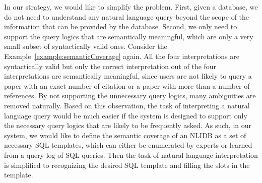 \documentclass{vldb}
\begin{document}
In our strategy, we would like to simplify the problem.  First, given a database, we do not need to understand any natural language query beyond the scope of the information that can be provided by the database.  Second, we only need to support the query logics that are semantically meaningful, which are only a very small subset of syntactically valid ones.  Consider the Example~\ref{example:semanticCoverage} again.  All the four interpretations are syntactically valid but only the correct interpretation out of the four interpretations are semantically meaningful, since users are not likely to query a paper with an exact number of citation or a paper with more than a number of references.  By not supporting the unnecessary query logics, many ambiguities are removed naturally.  Based on this observation, the task of interpreting a natural language query would be much easier if the system is designed to support only the necessary query logics that are likely to be frequently asked.  As such, in our system, we would like to define the semantic coverage of an NLIDB as a set of necessary SQL templates, which can either be enumerated by experts or learned from a query log of SQL queries.  Then the task of natural language interpretation is simplified to recognizing the desired SQL template and filling the slots in the template.  
\end{document}
